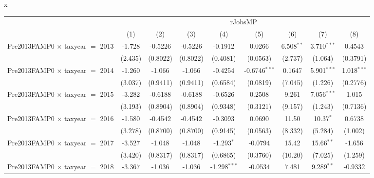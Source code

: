 x
\begingroup
\centering
\begin{tabular}{lcccccccc}
   \toprule
    & \multicolumn{8}{c}{rJobsMP}\\
                                           & (1)           & (2)           & (3)           & (4)            & (5)             & (6)           & (7)           & (8)\\  
   \midrule 
   Pre2013FAMP0 $\times$ taxyear $=$ 2013  & -1.728        & -0.5226       & -0.5226       & -0.1912        & 0.0266          & 6.508$^{**}$  & 3.710$^{***}$ & 0.4543\\   
                                           & (2.435)       & (0.8022)      & (0.8022)      & (0.4081)       & (0.0563)        & (2.737)       & (1.064)       & (0.3791)\\   
   Pre2013FAMP0 $\times$ taxyear $=$ 2014  & -1.260        & -1.066        & -1.066        & -0.4254        & -0.6746$^{***}$ & 0.1647        & 5.901$^{***}$ & 1.018$^{***}$\\   
                                           & (3.037)       & (0.9411)      & (0.9411)      & (0.6584)       & (0.0819)        & (7.045)       & (1.226)       & (0.2776)\\   
   Pre2013FAMP0 $\times$ taxyear $=$ 2015  & -3.282        & -0.6188       & -0.6188       & -0.6526        & 0.2508          & 9.261         & 7.056$^{***}$ & 1.015\\   
                                           & (3.193)       & (0.8904)      & (0.8904)      & (0.9348)       & (0.3121)        & (9.157)       & (1.243)       & (0.7136)\\   
   Pre2013FAMP0 $\times$ taxyear $=$ 2016  & -1.580        & -0.4542       & -0.4542       & -0.3093        & 0.0690          & 11.50         & 10.37$^{*}$   & 0.6738\\   
                                           & (3.278)       & (0.8700)      & (0.8700)      & (0.9145)       & (0.0563)        & (8.332)       & (5.284)       & (1.002)\\   
   Pre2013FAMP0 $\times$ taxyear $=$ 2017  & -3.527        & -1.048        & -1.048        & -1.293$^{*}$   & -0.0794         & 15.42         & 15.66$^{**}$  & -1.656\\   
                                           & (3.420)       & (0.8317)      & (0.8317)      & (0.6865)       & (0.3760)        & (10.20)       & (7.025)       & (1.259)\\   
   Pre2013FAMP0 $\times$ taxyear $=$ 2018  & -3.367        & -1.036        & -1.036        & -1.298$^{***}$ & -0.0534         & 7.481         & 9.289$^{**}$  & -0.9332\\   

\end{tabular}
